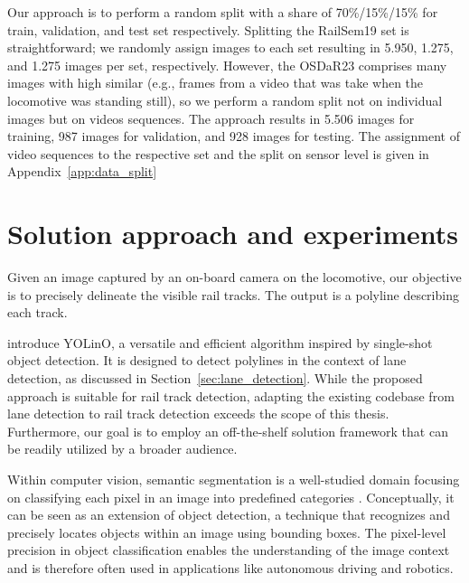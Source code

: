 \documentclass[Master,MDS,english]{BASE/twbook} %
\begin{document}
Our approach is to perform a random split with a share of 70\%/15\%/15\% for train, validation, and test set respectively. Splitting the RailSem19 set is straightforward; we randomly assign images to each set resulting in 5.950, 1.275, and 1.275 images per set, respectively. However, the OSDaR23 comprises many images with high similar (e.g., frames from a video that was take when the locomotive was standing still), so we perform a random split not on individual images but on videos sequences. The approach results in 5.506 images for training, 987 images for validation, and 928 images for testing.
The assignment of video sequences to the respective set and the split on sensor level is given in Appendix~\ref{app:data_split}



\chapter{Solution approach and experiments} %

Given an image captured by an on-board camera on the locomotive, our objective is to precisely delineate the visible rail tracks. The output is  a polyline describing each track.

\cite{meyer2021yolino} introduce YOLinO, a versatile and efficient algorithm inspired by single-shot object detection. It is designed to detect polylines in the context of lane detection, as discussed in Section~\ref{sec:lane_detection}. While the proposed approach is suitable for rail track detection, adapting the existing codebase from lane detection to rail track detection exceeds the scope of this thesis. Furthermore, our goal is to employ an off-the-shelf solution framework that can be readily utilized by a broader audience.

Within computer vision, semantic segmentation is a well-studied domain focusing on classifying each pixel in an image into predefined categories \citep{MO2022626}. Conceptually, it 
can be seen as an extension of object detection, a technique that recognizes and precisely locates objects within an image using bounding boxes.
The pixel-level precision in object classification enables the understanding of the image context and is therefore often used in applications like autonomous driving and robotics.
\end{document}

